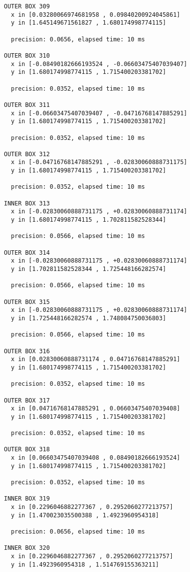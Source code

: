 \begin{verbatim}
OUTER BOX 309
  x in [0.03280066974681958 , 0.09840200924045861]
  y in [1.645149671561827 , 1.680174998774115]

  precision: 0.0656, elapsed time: 10 ms

OUTER BOX 310
  x in [-0.08490182666193524 , -0.06603475407039407]
  y in [1.680174998774115 , 1.715400203381702]

  precision: 0.0352, elapsed time: 10 ms

OUTER BOX 311
  x in [-0.06603475407039407 , -0.04716768147885291]
  y in [1.680174998774115 , 1.715400203381702]

  precision: 0.0352, elapsed time: 10 ms

OUTER BOX 312
  x in [-0.04716768147885291 , -0.02830060888731175]
  y in [1.680174998774115 , 1.715400203381702]

  precision: 0.0352, elapsed time: 10 ms

INNER BOX 313
  x in [-0.02830060888731175 , +0.02830060888731174]
  y in [1.680174998774115 , 1.702811582528344]

  precision: 0.0566, elapsed time: 10 ms

OUTER BOX 314
  x in [-0.02830060888731175 , +0.02830060888731174]
  y in [1.702811582528344 , 1.725448166282574]

  precision: 0.0566, elapsed time: 10 ms

OUTER BOX 315
  x in [-0.02830060888731175 , +0.02830060888731174]
  y in [1.725448166282574 , 1.748084750036803]

  precision: 0.0566, elapsed time: 10 ms

OUTER BOX 316
  x in [0.02830060888731174 , 0.04716768147885291]
  y in [1.680174998774115 , 1.715400203381702]

  precision: 0.0352, elapsed time: 10 ms

OUTER BOX 317
  x in [0.04716768147885291 , 0.06603475407039408]
  y in [1.680174998774115 , 1.715400203381702]

  precision: 0.0352, elapsed time: 10 ms

OUTER BOX 318
  x in [0.06603475407039408 , 0.08490182666193524]
  y in [1.680174998774115 , 1.715400203381702]

  precision: 0.0352, elapsed time: 10 ms

INNER BOX 319
  x in [0.2296046882277367 , 0.2952060277213757]
  y in [1.470023035500388 , 1.4923960954318]

  precision: 0.0656, elapsed time: 10 ms

INNER BOX 320
  x in [0.2296046882277367 , 0.2952060277213757]
  y in [1.4923960954318 , 1.514769155363211]


\end{verbatim}
